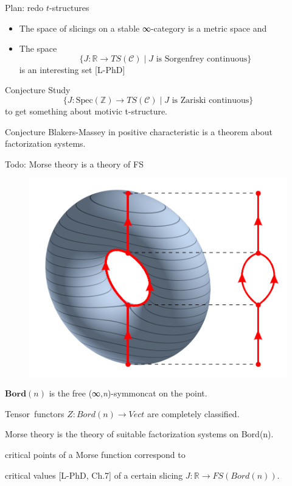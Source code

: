 \documentclass{beamer}
\begin{document}
\begin{frame}{Plan: redo $t$-structures}\small
   \begin{itemize}
     \item<+-> The space of \alert{slicings} on a stable ∞-category is a metric space and

     \item<+-> The space \[\{ J \colon \mathbb R \to TS(\mathcal C) \mid J \text{ is Sorgenfrey continuous} \}\]
     is an interesting set [\alert{L-PhD}]
    \end{itemize}

    \onslide<+->
    \begin{block}{Conjecture}
\vspace{.5mm}
  Study
\[\{ J \colon \text{Spec}(\mathbb Z) \to TS(\mathcal C) \mid J \text{ is Zariski continuous} \}\]
to get something about motivic t-structure.
 \end{block}
 \onslide<+->
 \begin{block}{Conjecture}
\vspace{.5mm}
 Blakers-Massey in positive characteristic is a theorem about factorization systems.
 \end{block}
\end{frame}
%
%
%
%
\begin{frame}{Todo: Morse theory is a theory of FS}
  \begin{figure}
\includegraphics[scale=.15]{3D-Leveltorus-Reebgraph.png}
  \end{figure}

  $\textbf{Bord}(n)$ is the free (∞,\emph{n})-symmoncat on the point.

  \vspace{1cm}
  Tensor~functors $Z : Bord(n) \to Vect$ are completely classified.

  \vspace{1cm}
  Morse theory is the theory of suitable factorization systems on Bord(n).

  \alert{critical points of a Morse function}
  correspond to

 \alert{critical values} [\alert{L-PhD}, Ch.7] of a certain slicing $J : \mathbb R \to FS(Bord(n))$.
\end{frame}
\end{document}
